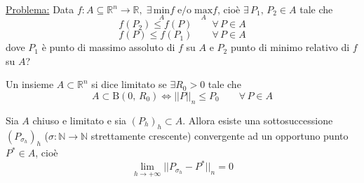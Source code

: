 \noindent \underline{Problema:} Data $f : A \subseteq \mathbb{R}^n \longrightarrow \mathbb{R}, \; \exists \, \underset{A}{\mathrm{min}}f \; \text{e/o} \; \underset{A}{\mathrm{max}}f$, cioè $\exists \, P_1,\,P_2 \in A$ tale che
$$
f(P_2) \leq f(P) \qquad \forall \, P \in A
$$
$$
f(P) \leq f(P_1) \qquad \forall \, P \in A
$$
dove $P_1$ è punto di massimo assoluto di $f$ su $A$ e $P_2$ punto di minimo relativo di $f$ su $A$?

\begin{definition}
Un insieme $A \subset \mathbb{R}^n$ si dice limitato se $\exists R_0 > 0$ tale che
$$
A \subset \mathrm{B}(0,\,R_0) \Longleftrightarrow ||P||_n \leq P_0 \qquad \forall \, P \in A
$$
\end{definition}

\begin{lemma}
Sia $A$ chiuso e limitato e sia $(P_h)_h \subset A$. Allora esiste una sottosuccessione $(P_{\sigma_h})_h$ ($\sigma : \mathbb{N} \longrightarrow \mathbb{N}$ strettamente crescente) convergente ad un opportuno punto $P^* \in A$, cioè
$$
\lim_{h \rightarrow +\infty} \lvert \lvert P_{\sigma_h} - P^* \lvert \lvert_n = 0
$$
\end{lemma}
